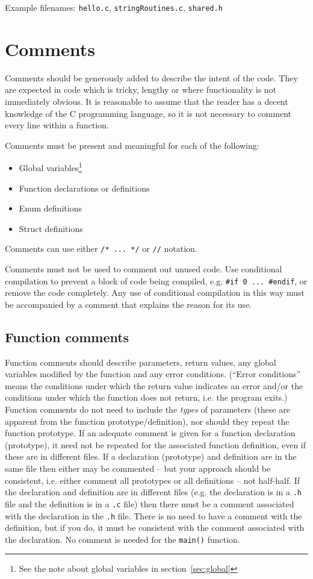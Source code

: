 \documentclass{article}
\newcommand{\icon}[1]{\raisebox{-3pt}{\texttt{[image: icons/\#1.png]}}}
\begin{document}
Example filenames: \texttt{hello.c}, \texttt{stringRoutines.c}, \texttt{shared.h}


\section{Comments\texorpdfstring{\protect\hfill\icon{MANUAL-CHECK}}{}}
Comments should be generously added to describe the intent of the code.
They are expected in code which is tricky, lengthy or where functionality is not immediately obvious.
It is reasonable to assume that the reader has a decent knowledge of the C programming language, 
so it is not necessary to comment every line within a function.

Comments must be present and meaningful for each of the following:
\begin{itemize}
\itemsep -2pt
    \item Global variables\footnote{See the note about global variables in section~\ref{sec:global}}
    \item Function declarations or definitions
    \item Enum definitions
    \item Struct definitions
\end{itemize}

Comments can use either \texttt{/* ... */} or \texttt{//} notation.

Comments must not be used to comment out unused code. Use conditional compilation to prevent a block of
code being compiled, e.g. \texttt{\#if 0 ... \#endif}, or remove the code completely. Any use of conditional compilation in
this way must be accompanied by a comment that explains the reason for its use.

\subsection{Function comments\texorpdfstring{\protect\hfill\icon{MANUAL-CHECK}}{}}
Function comments should describe parameters, return values, any global variables modified by the function and any error conditions. (``Error conditions'' means
the conditions under which the return value indicates an error and/or the conditions under which the 
function does not return, i.e. the program exits.)
Function comments do not need to include the \textit{types} of parameters (these are apparent from the function prototype/definition), 
nor should they repeat the function prototype. If an adequate comment is given for a function 
declaration (prototype), it need not be repeated for the associated function definition, even if these are in 
different files. If a declaration (prototype) and
definition are in the same file then either may be commented -- but your approach should be consistent, i.e. either comment
all prototypes or all definitions -- not half-half. If the declaration and definition are in different files
(e.g. the declaration is in a \texttt{.h} file and the definition is in a \texttt{.c} file) then there must be a comment
associated with the declaration in the \texttt{.h} file. There is no need to have a comment with the definition, 
but if you do, it must be consistent with the comment associated with the declaration.
No comment is needed for the \texttt{main()} function.
\end{document}
